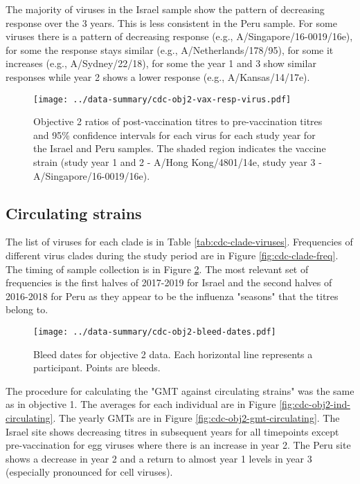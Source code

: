 \documentclass[12pt]{article}
\begin{document}
The majority of viruses in the Israel sample show the pattern of decreasing response over the 3 years. This is less consistent in the Peru sample. For some viruses
there is a pattern of decreasing response (e.g., A/Singapore/16-0019/16e), for some the response stays similar (e.g., A/Netherlands/178/95), for some it increases
(e.g., A/Sydney/22/18), for some the year 1 and 3 show similar responses while
year 2 shows a lower response (e.g., A/Kansas/14/17e).

\begin{figure}
	\texttt{[image: ../data-summary/cdc-obj2-vax-resp-virus.pdf]}
	\caption{Objective 2 ratios of post-vaccination titres to pre-vaccination titres and 95\% confidence intervals for each virus for each study year for the Israel and Peru samples. The shaded region indicates the vaccine strain (study year 1 and 2 - A/Hong Kong/4801/14e, study year 3 - A/Singapore/16-0019/16e).}
	\label{fig:cdc-obj2-vax-resp-virus}
\end{figure}

\subsection{Circulating strains}

The list of viruses for each clade is in Table \ref{tab:cdc-clade-viruses}. Frequencies of different virus clades during the study period are in Figure \ref{fig:cdc-clade-freq}. The timing of sample collection is in Figure \ref{fig:cdc-obj2-bleed-dates}. The most relevant set of frequencies is the first halves of 2017-2019 for Israel and the second halves of 2016-2018 for Peru as they appear to be the influenza "seasons" that the titres belong to.

\begin{figure}
	\texttt{[image: ../data-summary/cdc-obj2-bleed-dates.pdf]}
	\caption{Bleed dates for objective 2 data. Each horizontal line represents a participant. Points are bleeds.}
	\label{fig:cdc-obj2-bleed-dates}
\end{figure}

The procedure for calculating the "GMT against circulating strains" was the same as in objective 1. The averages for each individual are in Figure \ref{fig:cdc-obj2-ind-circulating}. The yearly GMTs are in Figure \ref{fig:cdc-obj2-gmt-circulating}. The Israel site shows decreasing titres in subsequent years for all timepoints except pre-vaccination for egg viruses where there is an increase in year 2. The Peru site shows a decrease in year 2 and a return to almost year 1 levels in year 3 (especially pronounced for cell viruses).
\end{document}
